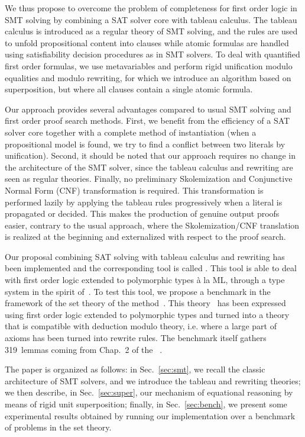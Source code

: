 We thus propose to overcome the problem of completeness for first
order logic in SMT solving by combining a SAT solver core with tableau
calculus. The tableau calculus is introduced as a regular theory of SMT solving,
and the rules are used to unfold propositional content into clauses while atomic
formulas are handled using satisfiability decision procedures as in
SMT solvers. To deal with quantified first order formulas, we use
metavariables and perform rigid unification modulo equalities and modulo rewriting,
for which we introduce an algorithm based on superposition, but where all clauses
contain a single atomic formula.

Our approach provides several advantages compared to usual SMT solving and first
order proof search methods. First, we benefit from the efficiency of a SAT
solver core together with a complete method of instantiation (when a
propositional model is found, we try to find a conflict between two literals by
unification). Second, it should be noted that our approach requires no change in
the architecture of the SMT solver, since the tableau calculus and rewriting are
seen as regular theories. Finally, no preliminary Skolemization and Conjunctive
Normal Form (CNF) transformation is required. This transformation is performed
lazily by applying the tableau rules progressively when a literal is propagated
or decided. This makes the production of genuine output proofs easier, contrary
to the usual approach, where the Skolemization/CNF translation is realized at
the beginning and externalized with respect to the proof search.

Our proposal combining SAT solving with tableau calculus and rewriting has been
implemented and the corresponding tool is called \archsat{}. This tool is able
to deal with first order logic extended to polymorphic types à la ML, through a
type system in the spirit of~\cite{BP13}. To test this tool, we propose a
benchmark in the framework of the set theory of the \bmth{}
method~\cite{B-Book}. This theory~\cite{BA15} has been expressed using first
order logic extended to polymorphic types and turned into a theory that is
compatible with deduction modulo theory, i.e. where a large part of axioms has
been turned into rewrite rules. The benchmark itself gathers 319~lemmas coming
from Chap.~2 of the \bbook{}~\cite{B-Book}.

The paper is organized as follows: in Sec.~\ref{sec:smt}, we recall the classic
architecture of SMT solvers, and we introduce the tableau and rewriting
theories; we then describe, in Sec.~\ref{sec:super}, our mechanism of equational
reasoning by means of rigid unit superposition; finally, in
Sec.~\ref{sec:bench}, we present some experimental results obtained by running
our implementation over a benchmark of problems in the \bmth{} set theory.
